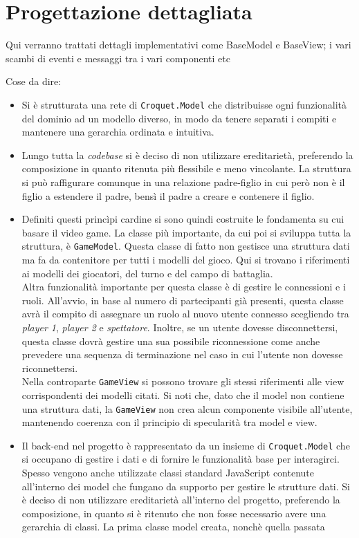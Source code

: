 \section{Progettazione dettagliata}\label{sec:progettazione}
Qui verranno trattati dettagli implementativi come BaseModel e BaseView;
i vari scambi di eventi e messaggi tra i vari componenti etc

Cose da dire:
\begin{itemize}
\item Si è strutturata una rete di \texttt{Croquet.Model} che distribuisse ogni funzionalità del dominio ad un modello diverso, in modo da tenere separati i compiti e mantenere una
    gerarchia ordinata e intuitiva.

\item Lungo tutta la \textit{codebase} si è deciso di non utilizzare ereditarietà, preferendo la composizione in quanto ritenuta più flessibile e meno vincolante. La struttura si può
raffigurare comunque in una relazione padre-figlio in cui però non è il figlio a estendere il padre, bensì il padre a creare e contenere il figlio.\\

\item Definiti questi princìpi cardine si sono quindi costruite le fondamenta su cui basare il video game. La classe più importante, da cui poi si sviluppa tutta la struttura, è 
\texttt{GameModel}. Questa classe di fatto non gestisce una struttura dati ma fa da contenitore per tutti i modelli del gioco. Qui si trovano i riferimenti ai modelli dei giocatori,
del turno e del campo di battaglia.\\
Altra funzionalità importante per questa classe è di gestire le connessioni e i ruoli. All'avvio, in base al numero di partecipanti già presenti, questa classe avrà il compito di 
assegnare un ruolo al nuovo utente connesso scegliendo tra \textit{player 1}, \textit{player 2} e \textit{spettatore}. Inoltre, se un utente dovesse disconnettersi, questa classe
dovrà gestire una sua possibile riconnessione come anche prevedere una sequenza di terminazione nel caso in cui l'utente non dovesse riconnettersi.\\
Nella controparte \texttt{GameView} si possono trovare gli stessi riferimenti alle view corrispondenti dei modelli citati. Si noti che, dato che il model non contiene una struttura
dati, la \texttt{GameView} non crea alcun componente visibile all'utente, mantenendo coerenza con il principio di specularità tra model e view.\\

\item Il back-end nel progetto è rappresentato da un insieme di \texttt{Croquet.Model} che si occupano di gestire i dati e di fornire le funzionalità base per interagirci. Spesso vengono
anche utilizzate classi standard JavaScript contenute all'interno dei model che fungano da supporto per gestire le strutture dati. Si è deciso di non utilizzare ereditarietà 
all'interno del progetto, preferendo la composizione, in quanto si è ritenuto che non fosse necessario avere una gerarchia di classi. 
La prima classe model creata, nonchè quella passata 
\end{itemize}